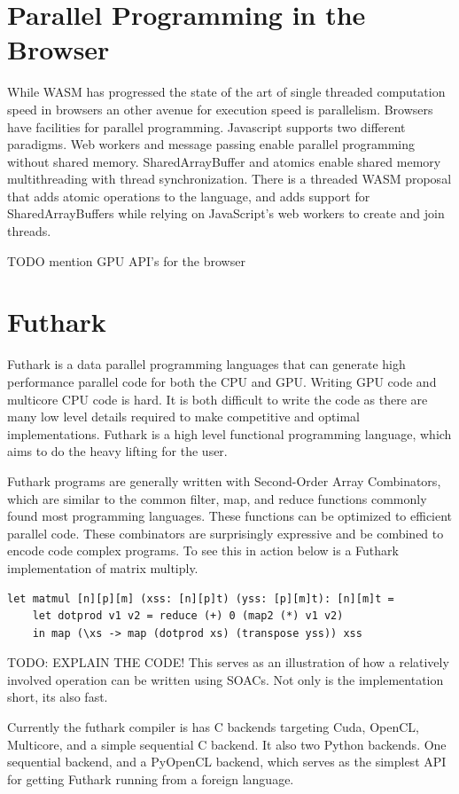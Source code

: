 \documentclass[11pt]{book}
\begin{document}
\section{Parallel Programming in the Browser}
While WASM has progressed the state of the art of single threaded computation speed in browsers an other avenue for execution speed is parallelism. Browsers have facilities for parallel programming. Javascript supports two different paradigms. Web  workers  and  message  passing  enable  parallel  programming  without  shared  memory. SharedArrayBuffer and atomics enable shared memory multithreading with thread synchronization.  There is a threaded WASM proposal that adds atomic operations to the language, and adds support for SharedArrayBuffers while relying on JavaScript’s web workers to create and join threads. 

TODO mention GPU API's for the browser

\section{Futhark}

Futhark is a data parallel programming languages that can generate high performance parallel code for both the CPU and GPU.  Writing GPU code and multicore CPU code is hard. It is both difficult to write the code as there are many low level details required to make competitive and optimal implementations. Futhark is a high level functional programming language, which aims to do the heavy lifting for the user.

Futhark programs are generally written with Second-Order Array Combinators, which are similar to the common filter, map, and reduce functions commonly found most programming languages. These functions can be optimized to efficient parallel code. These combinators are surprisingly expressive and be combined to encode code complex programs. To see this in action below is a Futhark implementation of matrix multiply.

\begin{verbatim}
let matmul [n][p][m] (xss: [n][p]t) (yss: [p][m]t): [n][m]t =
    let dotprod v1 v2 = reduce (+) 0 (map2 (*) v1 v2)
    in map (\xs -> map (dotprod xs) (transpose yss)) xss
\end{verbatim}
TODO: EXPLAIN THE CODE!
This serves as an illustration of how a relatively involved operation can be written using SOACs. Not only is the implementation short, its also fast.

Currently the futhark compiler is has C backends targeting Cuda, OpenCL, Multicore, and a simple sequential C backend. It also two Python backends. One sequential backend, and a PyOpenCL backend, which serves as the simplest API for getting Futhark running from a foreign language. 
\end{document}
